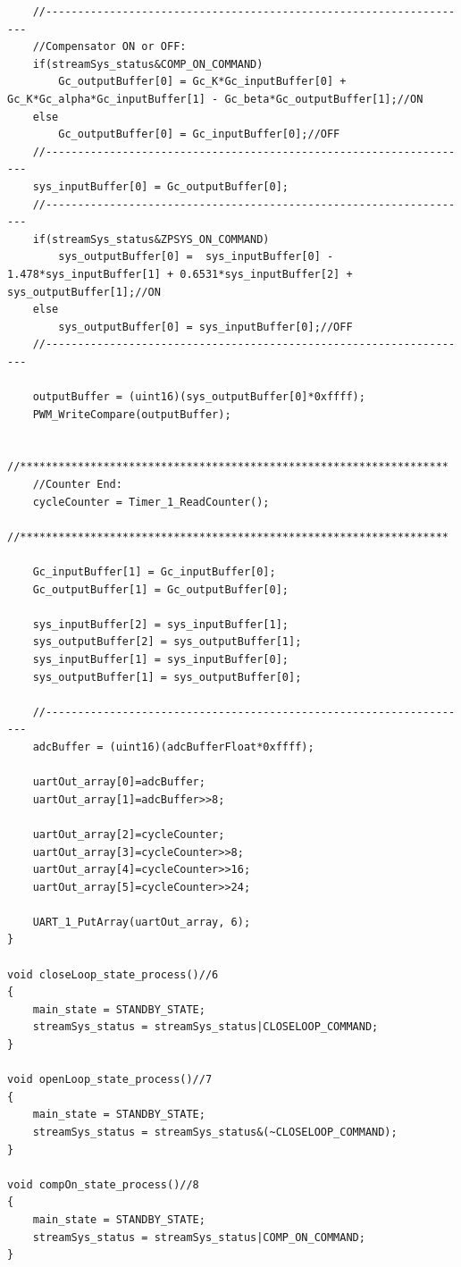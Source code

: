 \documentclass[
	article,			%
	11pt,				%
	oneside,			%
	a4paper,			%
	english,			%
	brazil,				%
	sumario=tradicional
	]{abntex2}
\begin{document}
\begin{apendicesenv}
\begin{lstlisting}
    //-------------------------------------------------------------------
    //Compensator ON or OFF:
    if(streamSys_status&COMP_ON_COMMAND)
        Gc_outputBuffer[0] = Gc_K*Gc_inputBuffer[0] + Gc_K*Gc_alpha*Gc_inputBuffer[1] - Gc_beta*Gc_outputBuffer[1];//ON         
    else
        Gc_outputBuffer[0] = Gc_inputBuffer[0];//OFF         
    //-------------------------------------------------------------------    
    sys_inputBuffer[0] = Gc_outputBuffer[0]; 
    //-------------------------------------------------------------------
    if(streamSys_status&ZPSYS_ON_COMMAND)
        sys_outputBuffer[0] =  sys_inputBuffer[0] - 1.478*sys_inputBuffer[1] + 0.6531*sys_inputBuffer[2] + sys_outputBuffer[1];//ON        
    else
        sys_outputBuffer[0] = sys_inputBuffer[0];//OFF                        
    //-------------------------------------------------------------------
  
    outputBuffer = (uint16)(sys_outputBuffer[0]*0xffff);   
    PWM_WriteCompare(outputBuffer);
    
    //*******************************************************************
    //Counter End:
    cycleCounter = Timer_1_ReadCounter(); 
    //*******************************************************************  
    
    Gc_inputBuffer[1] = Gc_inputBuffer[0];
    Gc_outputBuffer[1] = Gc_outputBuffer[0];
    
    sys_inputBuffer[2] = sys_inputBuffer[1];
    sys_outputBuffer[2] = sys_outputBuffer[1];  
    sys_inputBuffer[1] = sys_inputBuffer[0];
    sys_outputBuffer[1] = sys_outputBuffer[0];
     
    //-------------------------------------------------------------------
    adcBuffer = (uint16)(adcBufferFloat*0xffff);
    
    uartOut_array[0]=adcBuffer;
    uartOut_array[1]=adcBuffer>>8;
    
    uartOut_array[2]=cycleCounter;
    uartOut_array[3]=cycleCounter>>8;
    uartOut_array[4]=cycleCounter>>16;
    uartOut_array[5]=cycleCounter>>24;
    
    UART_1_PutArray(uartOut_array, 6);
}

void closeLoop_state_process()//6
{
    main_state = STANDBY_STATE;
    streamSys_status = streamSys_status|CLOSELOOP_COMMAND;   
}

void openLoop_state_process()//7
{
    main_state = STANDBY_STATE;
    streamSys_status = streamSys_status&(~CLOSELOOP_COMMAND);    
}

void compOn_state_process()//8
{
    main_state = STANDBY_STATE;
    streamSys_status = streamSys_status|COMP_ON_COMMAND; 
}


\end{lstlisting}
\end{apendicesenv}
\end{document}
